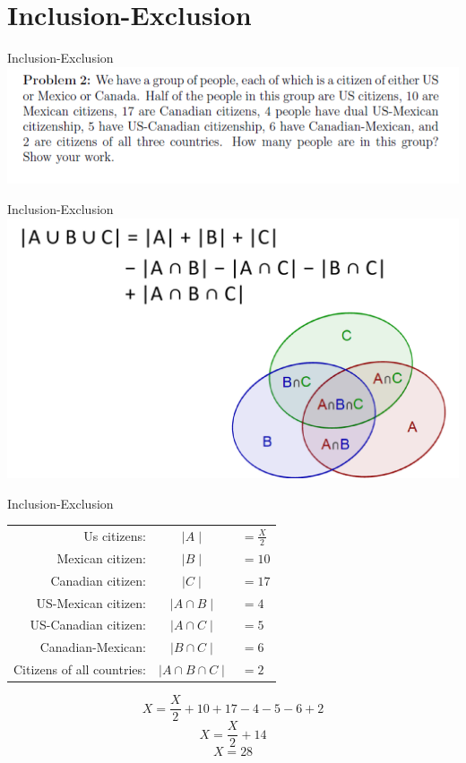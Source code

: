 \documentclass{beamer}
\begin{document}
\section{Inclusion-Exclusion }

\begin{frame}{Inclusion-Exclusion}
    \centering
    \includegraphics[width=.7\linewidth]{3.PNG}
\end{frame}
\begin{frame}{Inclusion-Exclusion}
    \centering
    \includegraphics[width=.7\linewidth]{4.PNG}
\end{frame}

\begin{frame}{Inclusion-Exclusion}
    \centering
    \begin{tabular}{r c l}
    Us citizens:                & $\mid A \mid$                & $= \frac{X}{2}$    \\
    Mexican citizen:            & $\mid B \mid$                & $= 10$             \\
    Canadian citizen:           & $\mid C \mid$                & $= 17$             \\
    US-Mexican citizen:         & $\mid A \cap B \mid$         & $= 4$              \\
    US-Canadian citizen:        & $\mid A \cap C \mid$         & $= 5$              \\
    Canadian-Mexican:           & $\mid B \cap C \mid$         & $= 6$              \\
    Citizens of all countries:  & $\mid A \cap B \cap C \mid$  & $= 2$              \\
    \end{tabular}

    $$X = \frac{X}{2} + 10 + 17 - 4 - 5 - 6 + 2$$
    $$X = \frac{X}{2} + 14$$
    $$X = 28$$

\end{frame}
\end{document}
